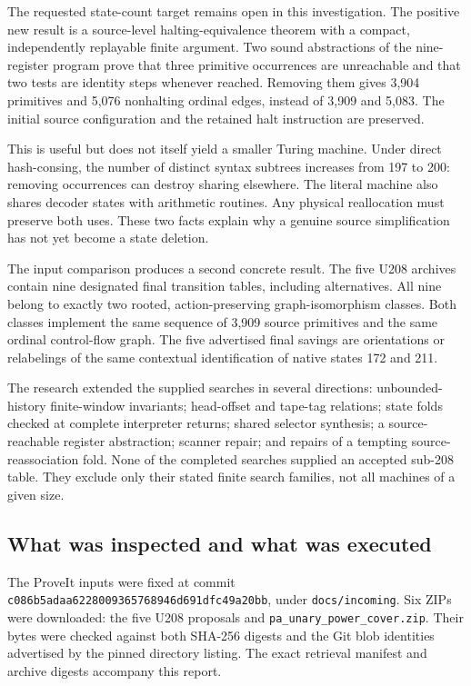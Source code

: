 \documentclass[11pt,a4paper]{article}
\theoremstyle{definition}
\newcommand{\file}[1]{\nolinkurl{#1}}
\newcommand{\snapshot}{\nolinkurl{c086b5adaa6228009365768946d691dfc49a20bb}}
\begin{document}
The requested state-count target remains open in this investigation. The positive new result is a source-level halting-equivalence theorem with a compact, independently replayable finite argument. Two sound abstractions of the nine-register program prove that three primitive occurrences are unreachable and that two tests are identity steps whenever reached. Removing them gives 3,904 primitives and 5,076 nonhalting ordinal edges, instead of 3,909 and 5,083. The initial source configuration and the retained halt instruction are preserved.

This is useful but does not itself yield a smaller Turing machine. Under direct hash-consing, the number of distinct syntax subtrees increases from 197 to 200: removing occurrences can destroy sharing elsewhere. The literal machine also shares decoder states with arithmetic routines. Any physical reallocation must preserve both uses. These two facts explain why a genuine source simplification has not yet become a state deletion.

The input comparison produces a second concrete result. The five U208 archives contain nine designated final transition tables, including alternatives. All nine belong to exactly two rooted, action-preserving graph-isomorphism classes. Both classes implement the same sequence of 3,909 source primitives and the same ordinal control-flow graph. The five advertised final savings are orientations or relabelings of the same contextual identification of native states 172 and 211.

The research extended the supplied searches in several directions: unbounded-history finite-window invariants; head-offset and tape-tag relations; state folds checked at complete interpreter returns; shared selector synthesis; a source-reachable register abstraction; scanner repair; and repairs of a tempting source-reassociation fold. None of the completed searches supplied an accepted sub-208 table. They exclude only their stated finite search families, not all machines of a given size.

\subsection{What was inspected and what was executed}

The ProveIt inputs were fixed at commit \snapshot, under \file{docs/incoming}. Six ZIPs were downloaded: the five U208 proposals and \file{pa_unary_power_cover.zip}. Their bytes were checked against both SHA-256 digests and the Git blob identities advertised by the pinned directory listing. The exact retrieval manifest and archive digests accompany this report.
\end{document}
